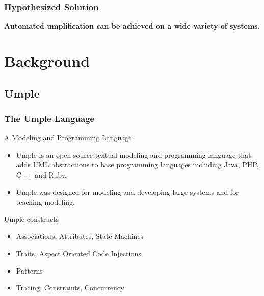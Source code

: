\documentclass[xcolor=table]{beamer}
\begin{document}
\begin{frame}
\frametitle{Hypothesized Solution}

\centering
\textcolor{important}{\large \textbf{Automated umplification can be achieved on a wide variety of systems.}}
\centering
\end{frame}

%

\section{Background} 

\subsection{Umple}
\begin{frame}
\frametitle{The Umple Language}
\begin{block}{A Modeling and Programming Language}
\begin{itemize}
\item Umple is an open-source textual modeling and programming language that adds UML abstractions to base programming languages including Java, PHP, C++ and Ruby.
\item Umple was designed for modeling and developing large systems and for teaching modeling.
\end{itemize}
\end{block}

\begin{block}{Umple constructs}
\begin{itemize}
\item Associations, Attributes, State Machines
\item Traits, Aspect Oriented Code Injections
\item Patterns
\item Tracing, Constraints, Concurrency
\end{itemize}
\end{block}

\end{frame}
\end{document}
